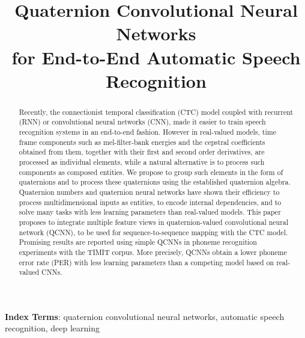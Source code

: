 \documentclass[a4paper]{article}
\title{Quaternion Convolutional Neural Networks \\for End-to-End Automatic Speech Recognition}
\begin{document}
\maketitle




\begin{abstract}
Recently, the connectionist temporal classification (CTC) model coupled with recurrent (RNN) or convolutional neural networks (CNN), made it easier to train speech recognition systems in an end-to-end fashion. However in real-valued models, time frame components such as mel-filter-bank energies and the cepstral coefficients obtained from them, together with their  first and second order derivatives, are processed as individual elements, while a natural alternative is to process such components as composed entities. We propose to group such elements in the form of quaternions and to process these quaternions using the established quaternion algebra. Quaternion numbers and quaternion neural networks have shown their efficiency to process multidimensional inputs as entities, to encode internal dependencies, and to solve many tasks with less learning parameters than real-valued models. This paper proposes to integrate multiple feature views in quaternion-valued convolutional neural network (QCNN), to be used for sequence-to-sequence mapping with the CTC model. Promising results are reported using simple QCNNs in phoneme recognition experiments with the TIMIT corpus. More precisely, QCNNs obtain a lower phoneme error rate (PER) with less learning parameters than a competing model based on real-valued CNNs.
\end{abstract}
 
\noindent\textbf{Index Terms}: quaternion convolutional neural networks, automatic speech recognition, deep learning
\end{document}
